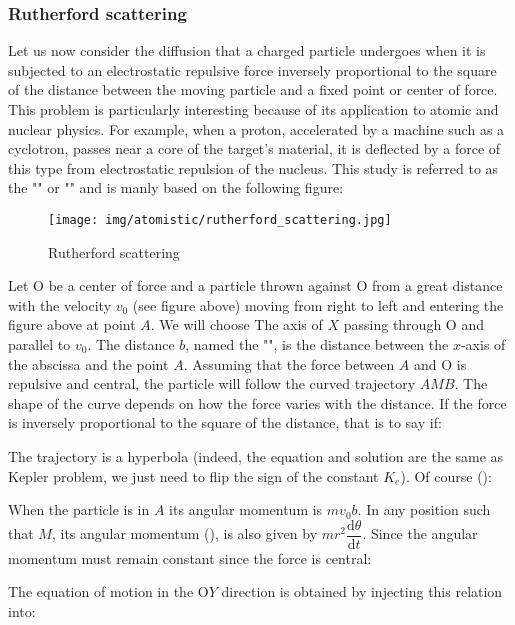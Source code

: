 	\subsubsection{Rutherford scattering}\label{rutherford scattering}
	Let us now consider the diffusion that a charged particle undergoes when it is subjected to an electrostatic repulsive force inversely proportional to the square of the distance between the moving particle and a fixed point or center of force. This problem is particularly interesting because of its application to atomic and nuclear physics. For example, when a proton, accelerated by a machine such as a cyclotron, passes near a core of the target's material, it is deflected by a force of this type from electrostatic repulsion of the nucleus. This study is referred to as the "" or "" and is manly based on the following figure:
	\begin{figure}[H]
		\centering
		\texttt{[image: img/atomistic/rutherford\_scattering.jpg]}
		\caption{Rutherford scattering}
	\end{figure}
	Let O be a center of force and a particle thrown against O from a great distance with the velocity $v_0$ (see figure above) moving from right to left and entering the figure above at point $A$. We will choose The axis of $X$ passing through O and parallel to $v_0$. The distance $b$, named the "", is the distance between the $x$-axis of the abscissa and the point $A$. Assuming that the force between $A$ and O is repulsive and central, the particle will follow the curved trajectory $AMB$. The shape of the curve depends on how the force varies with the distance. If the force is inversely proportional to the square of the distance, that is to say if:
	
	The trajectory is a hyperbola (indeed, the equation and solution are the same as Kepler problem, we just need to flip the sign of the constant $K_e$). Of course ():
	
	When the particle is in $A$ its angular momentum is $mv_0b$. In any position such that $M$, its angular momentum (), is also given by $mr^2\dfrac{\mathrm{d}\theta}{\mathrm{d}t}$. Since the angular momentum must remain constant since the force is central:
	
	The equation of motion in the O$Y$ direction is obtained by injecting this relation into:
	
